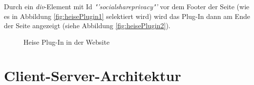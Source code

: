 Durch ein \textit{div}-Element mit Id \textit{"'socialshareprivacy"'} vor dem Footer der Seite (wie es in Abbildung \vref{fig:heisePlugin1} selektiert wird) wird das Plug-In dann am Ende der Seite angezeigt (siehe Abbildung \vref{fig:heisePlugin2}).

\begin{figure}[!h]
	\caption{Heise Plug-In in der Website}
	\label{fig:heisePlugin2}
\end{figure}

\chapter{Client-Server-Architektur}
\label{Client-Server-Architektur}

